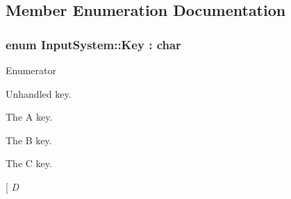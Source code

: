 \subsection{Member Enumeration Documentation}
\hypertarget{class_input_system_ad2fd19ae265c6309c2f91259b757e8b4}{}
\subsubsection[{Key}]{\setlength{\rightskip}{0pt plus 5cm}enum {\bf Input\+System\+::\+Key} \+: char\hspace{0.3cm}{\ttfamily [strong]}}\label{class_input_system_ad2fd19ae265c6309c2f91259b757e8b4}
\begin{Desc}
\item[Enumerator]\par
\begin{description}
\item[{\em 
\hypertarget{class_input_system_ad2fd19ae265c6309c2f91259b757e8b4a88183b946cc5f0e8c96b2e66e1c74a7e}{}Unknown\label{class_input_system_ad2fd19ae265c6309c2f91259b757e8b4a88183b946cc5f0e8c96b2e66e1c74a7e}
}]Unhandled key. \item[{\em 
\hypertarget{class_input_system_ad2fd19ae265c6309c2f91259b757e8b4a7fc56270e7a70fa81a5935b72eacbe29}{}A\label{class_input_system_ad2fd19ae265c6309c2f91259b757e8b4a7fc56270e7a70fa81a5935b72eacbe29}
}]The A key. \item[{\em 
\hypertarget{class_input_system_ad2fd19ae265c6309c2f91259b757e8b4a9d5ed678fe57bcca610140957afab571}{}B\label{class_input_system_ad2fd19ae265c6309c2f91259b757e8b4a9d5ed678fe57bcca610140957afab571}
}]The B key. \item[{\em 
\hypertarget{class_input_system_ad2fd19ae265c6309c2f91259b757e8b4a0d61f8370cad1d412f80b84d143e1257}{}C\label{class_input_system_ad2fd19ae265c6309c2f91259b757e8b4a0d61f8370cad1d412f80b84d143e1257}
}]The C key. \item[{\em 
\hypertarget{class_input_system_ad2fd19ae265c6309c2f91259b757e8b4af623e75af30e62bbd73d6df5b50bb7b5}{}D\label{class_input_system_ad2fd19ae265c6309c2f91259b757e8b4af623e75af30e62bbd73d6df5b50bb7b5}
}
\end{description}
\end{Desc}
